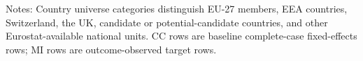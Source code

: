 \vspace{0.2em}
\begin{minipage}{0.96\textwidth}\scriptsize Notes: Country universe categories distinguish EU-27 members, EEA countries, Switzerland, the UK, candidate or potential-candidate countries, and other Eurostat-available national units. CC rows are baseline complete-case fixed-effects rows; MI rows are outcome-observed target rows.\end{minipage}
